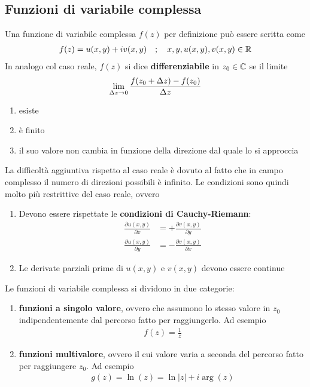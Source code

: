 \newpage

\subsection{Funzioni di variabile complessa}

Una funzione di variabile complessa $f(z)$ per definizione può essere scritta come
\begin{align}
	f(z) = u(x,y) + i v(x,y) \quad ; \quad x,y, u(x,y), v(x,y) \in \mathbb{R}
\end{align}
In analogo col caso reale, $f(z)$ si dice \textbf{differenziabile}\cite{MfP} in $z_0 \in \mathbb{C}$ se il limite
\begin{align}
	\underset{\Delta z \rightarrow 0}{\lim} \, \frac{f(z_0 + \Delta z) - f(z_0)}{\Delta z}
\end{align}
\begin{enumerate}
	\item esiste
	\item è finito
	\item il suo valore non cambia in funzione della direzione dal quale lo si approccia
\end{enumerate}
La difficoltà aggiuntiva rispetto al caso reale è dovuto al fatto che in campo complesso il numero di direzioni possibili è infinito. Le condizioni sono quindi molto più restrittive del caso reale, ovvero
\begin{enumerate}
	\item Devono essere rispettate le \textbf{condizioni di Cauchy-Riemann}:
	\begin{align}
		\frac{\partial u(x,y)}{\partial x} &= +\frac{\partial v(x,y)}{\partial y}\\
		\frac{\partial u(x,y)}{\partial y} &= -\frac{\partial v(x,y)}{\partial x}		
	\end{align}
	\item Le derivate parziali prime di $u(x,y)$ e $v(x,y)$ devono essere continue
\end{enumerate}

Le funzioni di variabile complessa si dividono in due categorie:
\begin{enumerate}
	\item \textbf{funzioni a singolo valore}, ovvero che assumono lo stesso valore in $z_0$ indipendentemente dal percorso fatto per raggiungerlo. Ad esempio
	\begin{align}
		f(z) = \frac{1}{z}
	\end{align}
	\item \textbf{funzioni multivalore}, ovvero il cui valore varia a seconda del percorso fatto per raggiungere $z_0$. Ad esempio
	\begin{align}
		g(z) = \ln(z) = \ln |z| + i \arg (z)
	\end{align}
\end{enumerate}


